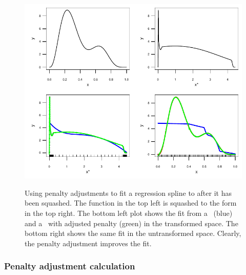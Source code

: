 \begin{figure}
\centering
\includegraphics[width=6in]{mds/figs/1dadjust.pdf} \\
\caption{Using penalty adjustments to fit a regression spline to  after it has been squashed. The function in the top left is squashed to the form in the top right. The bottom left plot shows the fit from a \tprs\ (blue) and a \tprs\ with adjusted penalty (green) in the transformed space. The bottom right shows the same fit in the untransformed space. Clearly, the penalty adjustment improves the fit.}
\label{1dadjust}
\end{figure}

\subsubsection{Penalty adjustment calculation}

